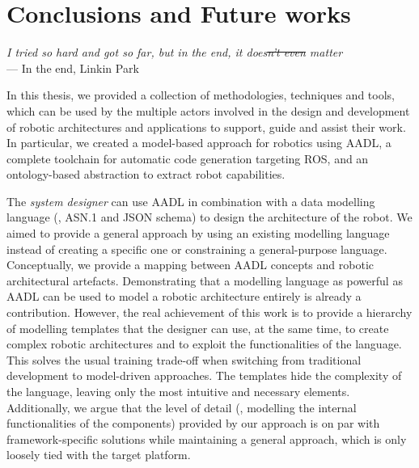 \chapter[Conclusions and Future works]{Conclusions and Future works}\label{ch:Conclusions}

\begin{flushright}{\slshape I tried so hard and got so far, but in the end, it does\st{n't even} matter} \\ \medskip
    ---  In the end, Linkin Park
\end{flushright}


In this thesis, we provided a collection of methodologies, techniques and tools, which can be used by the multiple actors involved in the design and development of robotic architectures and applications to support, guide and assist their work. In particular, we created a model-based approach for robotics using AADL, a complete toolchain for automatic code generation targeting ROS, and an ontology-based abstraction to extract robot capabilities.

The \textit{system designer} can use AADL in combination with a data modelling language (\ie, ASN.1 and JSON schema) to design the architecture of the robot. We aimed to provide a general approach by using an existing modelling language instead of creating a specific one or constraining a general-purpose language. Conceptually, we provide a mapping between AADL concepts and robotic architectural artefacts. Demonstrating that a modelling language as powerful as AADL can be used to model a robotic architecture entirely is already a contribution. However, the real achievement of this work is to provide a hierarchy of modelling templates that the designer can use, at the same time, to create complex robotic architectures and to exploit the functionalities of the language. This solves the usual training trade-off when switching from traditional development to model-driven approaches. The templates hide the complexity of the language, leaving only the most intuitive and necessary elements. Additionally, we argue that the level of detail (\ie, modelling the internal functionalities of the components) provided by our approach is on par with framework-specific solutions while maintaining a general approach, which is only loosely tied with the target platform.

